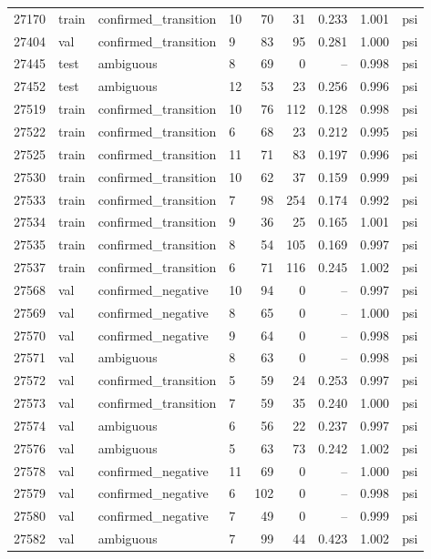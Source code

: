 \begin{longtable}{rlllrrrrl}
27170 & train & confirmed\_transition & 10 & 70 & 31 & 0.233 & 1.001 & psi \\
27404 & val & confirmed\_transition & 9 & 83 & 95 & 0.281 & 1.000 & psi \\
27445 & test & ambiguous & 8 & 69 & 0 & -- & 0.998 & psi \\
27452 & test & ambiguous & 12 & 53 & 23 & 0.256 & 0.996 & psi \\
27519 & train & confirmed\_transition & 10 & 76 & 112 & 0.128 & 0.998 & psi \\
27522 & train & confirmed\_transition & 6 & 68 & 23 & 0.212 & 0.995 & psi \\
27525 & train & confirmed\_transition & 11 & 71 & 83 & 0.197 & 0.996 & psi \\
27530 & train & confirmed\_transition & 10 & 62 & 37 & 0.159 & 0.999 & psi \\
27533 & train & confirmed\_transition & 7 & 98 & 254 & 0.174 & 0.992 & psi \\
27534 & train & confirmed\_transition & 9 & 36 & 25 & 0.165 & 1.001 & psi \\
27535 & train & confirmed\_transition & 8 & 54 & 105 & 0.169 & 0.997 & psi \\
27537 & train & confirmed\_transition & 6 & 71 & 116 & 0.245 & 1.002 & psi \\
27568 & val & confirmed\_negative & 10 & 94 & 0 & -- & 0.997 & psi \\
27569 & val & confirmed\_negative & 8 & 65 & 0 & -- & 1.000 & psi \\
27570 & val & confirmed\_negative & 9 & 64 & 0 & -- & 0.998 & psi \\
27571 & val & ambiguous & 8 & 63 & 0 & -- & 0.998 & psi \\
27572 & val & confirmed\_transition & 5 & 59 & 24 & 0.253 & 0.997 & psi \\
27573 & val & confirmed\_transition & 7 & 59 & 35 & 0.240 & 1.000 & psi \\
27574 & val & ambiguous & 6 & 56 & 22 & 0.237 & 0.997 & psi \\
27576 & val & ambiguous & 5 & 63 & 73 & 0.242 & 1.002 & psi \\
27578 & val & confirmed\_negative & 11 & 69 & 0 & -- & 1.000 & psi \\
27579 & val & confirmed\_negative & 6 & 102 & 0 & -- & 0.998 & psi \\
27580 & val & confirmed\_negative & 7 & 49 & 0 & -- & 0.999 & psi \\
27582 & val & ambiguous & 7 & 99 & 44 & 0.423 & 1.002 & psi \\

\end{longtable}
